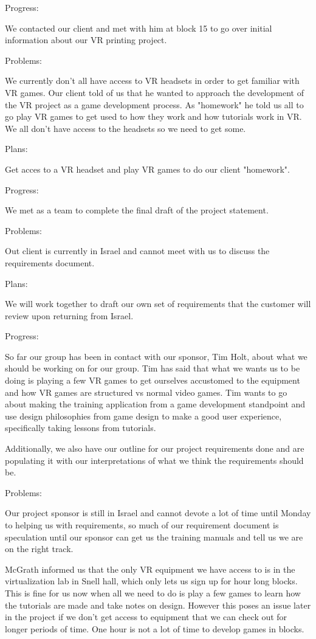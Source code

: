 Progress:

We contacted our client and met with him at block 15 to go over initial information about our VR printing project.

Problems:

We currently don't all have access to VR headsets in order to get familiar with VR games. Our client told of us that he wanted to approach the development of the VR project as a game development process. As "homework" he told us all to go play VR games to get used to how they work and how tutorials work in VR. We all don't have access to the headsets so we need to get some.

Plans:

Get acces to a VR headset and play VR games to do our client "homework".

Progress:

We met as a team to complete the final draft of the project statement.

Problems:

Out client is currently in Israel and cannot meet with us to discuss the requirements document.

Plans:

We will work together to draft our own set of requirements that the customer will review upon returning from Israel.

Progress:

So far our group has been in contact with our sponsor, Tim Holt, about what we should be working on for our group. Tim has said that what we wants us to be doing is playing a few VR games to get ourselves accustomed to the equipment and how VR games are structured vs normal video games. Tim wants to go about making the training application from a game development standpoint and use design philosophies from game design to make a good user experience, specifically taking lessons from tutorials.

Additionally, we also have our outline for our project requirements done and are populating it with our interpretations of what we think the requirements should be.

Problems:

Our project sponsor is still in Israel and cannot devote a lot of time until Monday to helping us with requirements, so much of our requirement document is speculation until our sponsor can get us the training manuals and tell us we are on the right track.

McGrath informed us that the only VR equipment we have access to is in the virtualization lab in Snell hall, which only lets us sign up for hour long blocks. This is fine for us now when all we need to do is play a few games to learn how the tutorials are made and take notes on design. However this poses an issue later in the project if we don't get access to equipment that we can check out for longer periods of time. One hour is not a lot of time to develop games in blocks.

